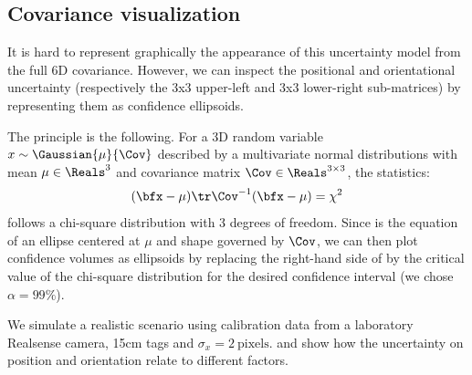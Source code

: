 
\subsection{Covariance visualization}

It is hard to represent graphically the appearance of this uncertainty model from the full 6D covariance. However, we can inspect the positional and 
orientational uncertainty (respectively the 3x3 upper-left and 3x3 lower-right sub-matrices) by representing them as confidence ellipsoids.

The principle is the following. For a 3D random variable $x \sim \Gaussian{\mu}{\Cov}$ described by a multivariate normal 
distributions with mean ${\bf\mu} \in \Reals^3$ and 
covariance matrix $\Cov \in \Reals^{3 \times 3}$, the statistics:
%
\begin{equation}
    (\bfx - {\bf\mu})\tr \Cov^{-1}(\bfx - {\bf\mu}) = \chi^2
    \label{eq:chi2}
\end{equation}
%
follows a chi-square distribution with 3 degrees of freedom. Since  is the equation of an ellipse centered at $\mu$ and shape 
governed by $\Cov$, we can then plot confidence volumes as ellipsoids by replacing the right-hand side of  
 by the critical value of the chi-square distribution for the desired confidence interval (we chose $\alpha=99\%$). 

We simulate a realistic scenario using calibration data from a laboratory Realsense camera, 15cm tags and $\sigma_x = 2~\text{pixels}$. 
 and  show how the uncertainty on position and orientation relate to different factors.

